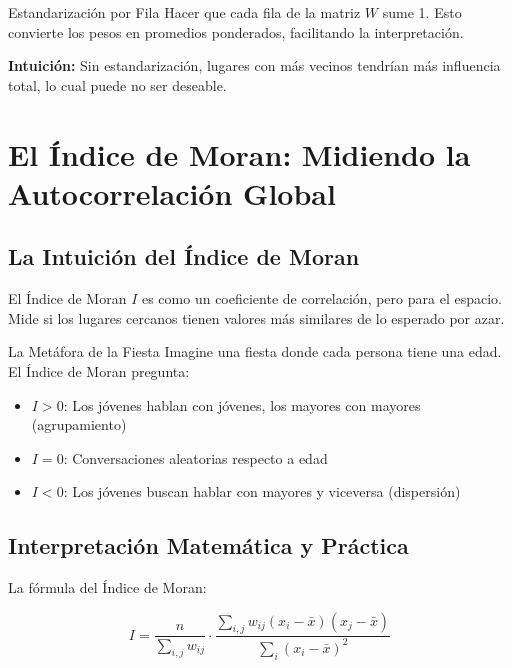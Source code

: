 \documentclass[12pt,a4paper]{article}
\begin{document}
\begin{conceptbox}{Estandarización por Fila}
Hacer que cada fila de la matriz $W$ sume 1. Esto convierte los pesos en promedios ponderados, facilitando la interpretación.
\end{conceptbox}

\textbf{Intuición:} Sin estandarización, lugares con más vecinos tendrían más influencia total, lo cual puede no ser deseable.

\section{El Índice de Moran: Midiendo la Autocorrelación Global}

\subsection{La Intuición del Índice de Moran}

El Índice de Moran $I$ es como un coeficiente de correlación, pero para el espacio. Mide si los lugares cercanos tienen valores más similares de lo esperado por azar.

\begin{analogia}{La Metáfora de la Fiesta}
Imagine una fiesta donde cada persona tiene una edad. El Índice de Moran pregunta: 
\begin{itemize}
    \item $I > 0$: Los jóvenes hablan con jóvenes, los mayores con mayores (agrupamiento)
    \item $I = 0$: Conversaciones aleatorias respecto a edad
    \item $I < 0$: Los jóvenes buscan hablar con mayores y viceversa (dispersión)
\end{itemize}
\end{analogia}

\subsection{Interpretación Matemática y Práctica}

La fórmula del Índice de Moran:

$$I = \frac{n}{\sum_{i,j} w_{ij}} \cdot \frac{\sum_{i,j} w_{ij}(x_i - \bar{x})(x_j - \bar{x})}{\sum_i (x_i - \bar{x})^2}$$
\end{document}
